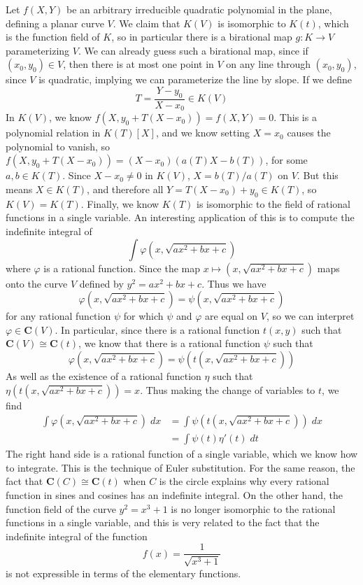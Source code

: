 \begin{example}
    Let $f(X,Y)$ be an arbitrary irreducible quadratic polynomial in the plane, defining a planar curve $V$. We claim that $K(V)$ is isomorphic to $K(t)$, which is the function field of $K$, so in particular there is a birational map $g: K \to V$ parameterizing $V$. We can already guess such a birational map, since if $(x_0,y_0) \in V$, then there is at most one point in $V$ on any line through $(x_0,y_0)$, since $V$ is quadratic, implying we can parameterize the line by slope. If we define
    \[ T = \frac{Y - y_0}{X - x_0} \in K(V) \]
    In $K(V)$, we know $f(X, y_0 + T(X - x_0)) = f(X,Y) = 0$. This is a polynomial relation in $K(T)[X]$, and we know setting $X = x_0$ causes the polynomial to vanish, so $f(X, y_0 + T(X - x_0)) = (X - x_0)(a(T)X - b(T))$, for some $a,b \in K(T)$. Since $X - x_0 \neq 0$ in $K(V)$, $X = b(T)/a(T)$ on $V$. But this means $X \in K(T)$, and therefore all $Y = T(X - x_0) + y_0 \in K(T)$, so $K(V) = K(T)$. Finally, we know $K(T)$ is isomorphic to the field of rational functions in a single variable. An interesting application of this is to compute the indefinite integral of
    \[ \int \varphi \left( x,\sqrt{ax^2 + bx + c} \right) \]
    where $\varphi$ is a rational function. Since the map $x \mapsto (x,\sqrt{ax^2 + bx + c})$ maps onto the curve $V$ defined by $y^2 = ax^2 + bx + c$. Thus we have
    \[ \varphi \left( x, \sqrt{ax^2 + bx + c} \right) = \psi \left( x, \sqrt{ax^2 + bx + c} \right)  \]
    for any rational function $\psi$ for which $\psi$ and $\varphi$ are equal on $V$, so we can interpret $\varphi \in \mathbf{C}(V)$. In particular, since there is a rational function $t(x,y)$ such that $\mathbf{C}(V) \cong \mathbf{C}(t)$, we know that there is a rational function $\psi$ such that
    \[ \varphi \left( x, \sqrt{ax^2 + bx + c} \right) = \psi \left( t \left( x, \sqrt{ax^2 + bx + c} \right) \right) \]
    As well as the existence of a rational function $\eta$ such that $\eta(t(x,\sqrt{ax^2 + bx + c})) = x$. Thus making the change of variables to $t$, we find
    \begin{align*}
        \int \varphi \left( x, \sqrt{ax^2 + bx + c} \right)\; dx &= \int \psi \left(t \left( x, \sqrt{ax^2 + bx + c} \right) \right)\; dx \\
        &= \int \psi(t) \eta'(t) \; dt
    \end{align*}
    The right hand side is a rational function of a single variable, which we know how to integrate. This is the technique of Euler substitution. For the same reason, the fact that $\mathbf{C}(C) \cong \mathbf{C}(t)$ when $C$ is the circle explains why every rational function in sines and cosines has an indefinite integral. On the other hand, the function field of the curve $y^2 = x^3 + 1$ is no longer isomorphic to the rational functions in a single variable, and this is very related to the fact that the indefinite integral of the function
    \[ f(x) = \frac{1}{\sqrt{x^3 + 1}} \]
    is not expressible in terms of the elementary functions.
\end{example}

